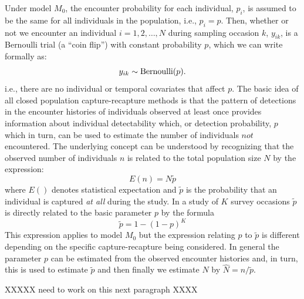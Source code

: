\documentclass{book}
\begin{document}
Under model $M_0$, the encounter probability for each individual,
$p_i$, is assumed to be the same for all individuals in the
population, i.e., $p_i = p$. Then, whether or not we encounter an
individual $i=1,2,\ldots,N$ during sampling occasion $k$, $y_{ik}$, is a Bernoulli
trial (a ``coin flip'')
with constant probability $p$, which we can write formally as:
\[
y_{ik} \sim \hbox{Bernoulli}(p).
\]
i.e.,  there are no individual or temporal
covariates that affect $p$. The basic idea of all closed population
capture-recapture methods  is that the pattern of
detections in the encounter histories of individuals observed at least
once provides information about individual detectability which, or
detection probability, $p$ which in
turn, can be used to estimate the number of individuals $not$
encountered.  The underlying concept can be understood by recognizing
that  the observed number of
individuals $n$ is related to the total population size $N$ by the
expression:
\[
 E(n) = N\tilde{p}
\]
where $E()$ denotes statistical expectation and $\tilde{p}$ is the
probability that an individual is captured {\it at all} during the
study. In a study of $K$ survey occasions $\tilde{p}$ is directly
related to the basic parameter $p$ by the formula
\[
 \tilde{p} = 1-(1-p)^K
\]
This expression applies to model $M_0$ but the
 expression relating $p$ to $\tilde{p}$ is different depending on
the specific  capture-recapture being considered.
In general the parameter $p$ can be estimated from the observed
encounter histories and, in turn, this is used to estimate $\tilde{p}$
and then finally we estimate $N$ by $\hat{N} = n/\tilde{p}$.

XXXXX need to work on this next paragraph XXXX
\end{document}
